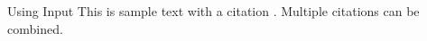 

Using Input
\lipsum[1-4]
This is sample text with a citation \cite{panch2018artificial}. Multiple citations \cite{panch2018artificial, lehman2022learning} can be combined.